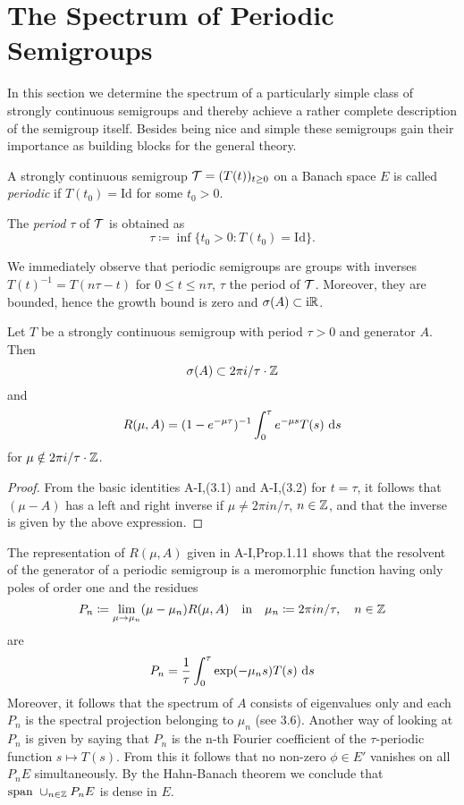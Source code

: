 \section{The Spectrum of Periodic Semigroups}\label{sec:a3-5}
In this section we determine the spectrum of a particularly simple class of strongly continuous semigroups and thereby achieve a rather complete description of the semigroup itself.
Besides being nice and simple these semigroups gain their importance as building blocks for the general theory.
\begin{definition}\label{def:a3-5.1}
A strongly continuous semigroup $\mathcal{T} = (T(t))_{t \geq 0}$ on a Banach space $E$ is called \emph{periodic} if $T(t_{0}) = \text{Id}$ for some $t_{0} > 0$.

The \emph{period} $\tau$ of $\mathcal{T}$ is obtained as 
%
\[
	\tau \coloneqq \inf\{t_{0} > 0 \colon T(t_{0}) = \text{Id}\} .
\]
%
\end{definition}
We immediately observe that periodic semigroups are groups with inverses $T(t)^{-1} = T(n\tau-t)$ for $0 \leq t \leq n\tau$, $\tau$ the period of $\mathcal{T}$.
Moreover, they are bounded, hence the growth bound is zero and $\sigma(A) \subset \mathrm{i}\mathbb{R}$.
\begin{lemma}\label{lem:a3-5.2}
Let $T$ be a strongly continuous semigroup with period $\tau > 0$ and generator $A$.
Then
\[
\sigma(A) \subset 2\pi i/\tau\cdot\mathbb{Z}
\]
and
\begin{equation}\label{eq:a3-5.1}
R(\mu,A) = (1-e^{-\mu\tau})^{-1} \int_{0}^{\tau}e^{-\mu s}T(s) \, \mathop{}\!\mathrm{d}{s}
\end{equation}
for $\mu \notin 2\pi i/\tau\cdot\mathbb{Z}$.
\end{lemma}
\begin{proof}
From the basic identities A-I,(3.1) and A-I,(3.2) for $t = \tau$, it follows that $(\mu - A)$ has a left and right inverse if $\mu \neq 2\pi in/\tau$, $n \in \mathbb{Z}$, and that the inverse is given by the above expression.
\end{proof}
The representation of $R(\mu,A)$ given in A-I,Prop.1.11 shows that the resolvent of the generator of a periodic semigroup is a meromorphic function having only poles of order one and the residues
\[
P_{n} \coloneqq \lim_{\mu \to \mu_{n}} (\mu-\mu_{n})R(\mu,A) \quad \text{in} \quad \mu_{n} \coloneqq 2\pi in/\tau, \quad n \in \mathbb{Z}
\]
are
\begin{equation}\label{eq:a3-5.2}
P_{n} = \frac{1}{\tau}\int_{0}^{\tau}\exp(-\mu_{n}s)T(s) \, \mathop{}\!\mathrm{d}{s}
\end{equation}
Moreover, it follows that the spectrum of $A$ consists of eigenvalues only and each $P_{n}$ is the spectral projection belonging to $\mu_{n}$ (see 3.6). 
Another way of looking at $P_{n}$ is given by saying that $P_{n}$ is the n-th Fourier coefficient of the $\tau$-periodic function $s \mapsto T(s)$.
From this it follows that no non-zero $\phi \in E'$ vanishes on all $P_{n}E$ simultaneously.
By the Hahn-Banach theorem we conclude that $\text{span } \cup_{n \in \mathbb{Z}} P_{n}E$ is dense in $E$.

